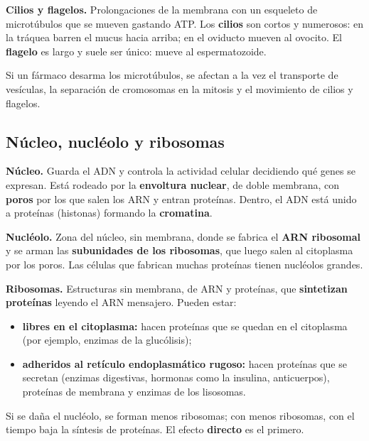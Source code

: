 

\textbf{Cilios y flagelos.} Prolongaciones de la membrana con un esqueleto de microtúbulos que se mueven gastando ATP. Los \textbf{cilios} son cortos y numerosos: en la tráquea barren el mucus hacia arriba; en el oviducto mueven al ovocito. El \textbf{flagelo} es largo y suele ser único: mueve al espermatozoide.

 
\begin{clave}[{Recuerda}] Si un fármaco desarma los microtúbulos, se afectan a la vez el transporte de vesículas, la separación de cromosomas en la mitosis y el movimiento de cilios y flagelos.\end{clave}
\subsection{Núcleo, nucléolo y ribosomas}
\textbf{Núcleo.} Guarda el ADN y controla la actividad celular decidiendo qué genes se expresan. Está rodeado por la \textbf{envoltura nuclear}, de doble membrana, con \textbf{poros} por los que salen los ARN y entran proteínas. Dentro, el ADN está unido a proteínas (histonas) formando la \textbf{cromatina}.

 

\textbf{Nucléolo.} Zona del núcleo, sin membrana, donde se fabrica el \textbf{ARN ribosomal} y se arman las \textbf{subunidades de los ribosomas}, que luego salen al citoplasma por los poros. Las células que fabrican muchas proteínas tienen nucléolos grandes.

  

\textbf{Ribosomas.} Estructuras sin membrana, de ARN y proteínas, que \textbf{sintetizan proteínas} leyendo el ARN mensajero. Pueden estar:

 
\begin{itemize}
  \item \textbf{libres en el citoplasma:} hacen proteínas que se quedan en el citoplasma (por ejemplo, enzimas de la glucólisis);
  \item \textbf{adheridos al retículo endoplasmático rugoso:} hacen proteínas que se secretan (enzimas digestivas, hormonas como la insulina, anticuerpos), proteínas de membrana y enzimas de los lisosomas.
\end{itemize}
 
\begin{clave} Si se daña el nucléolo, se forman menos ribosomas; con menos ribosomas, con el tiempo baja la síntesis de proteínas. El efecto \textbf{directo} es el primero.\end{clave}
